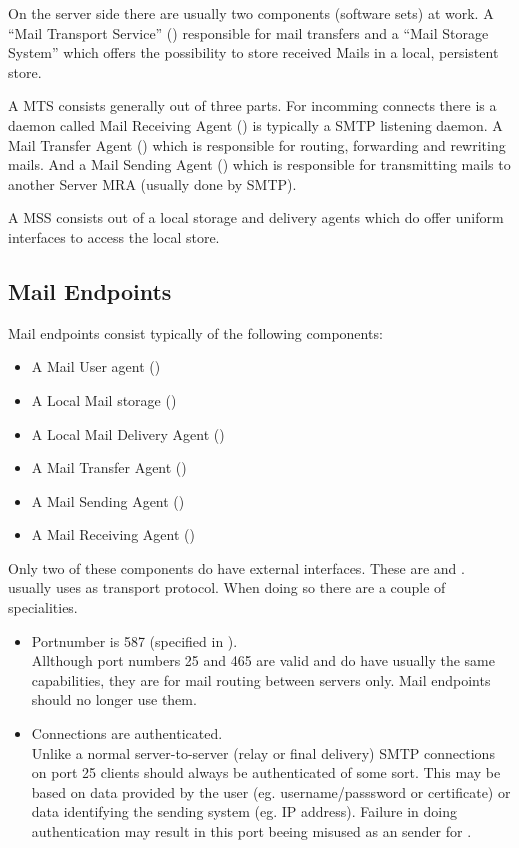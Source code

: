 On the server side there are usually two components (software sets) at work. A ``Mail Transport Service'' () responsible for mail transfers and a ``Mail Storage System'' which offers the possibility to store received Mails in a local, persistent store.\par

A MTS consists generally out of three parts. For incomming connects there is a daemon called Mail Receiving Agent () is typically a SMTP listening daemon. A Mail Transfer Agent () which is responsible for routing, forwarding and rewriting mails. And a Mail Sending Agent () which is responsible for transmitting mails to another Server MRA (usually done by SMTP).\par

A MSS consists out of a local storage and delivery agents which do offer uniform interfaces to access the local store.\par

\subsection{Mail Endpoints}
Mail endpoints consist typically of the following components:
\begin{itemize}
\item A Mail User agent ()
\item A Local Mail storage ()
\item A Local Mail Delivery Agent ()
\item A Mail Transfer Agent ()
\item A Mail Sending Agent ()
\item A Mail Receiving Agent ()
\end{itemize}

Only two of these components do have external interfaces. These are  and .  usually uses  as transport protocol. When doing so there are a couple of specialities. 
\begin{itemize}
\item Portnumber is 587 (specified in \cite{RFC4409}).\\
Allthough port numbers 25 and 465 are valid and do have usually the same capabilities, they are for mail routing between servers only. Mail endpoints should no longer use them.
\item Connections are authenticated.\\
Unlike a normal server-to-server (relay or final delivery) SMTP connections on port 25 clients should always be authenticated of some sort. This may be based on data provided by the user (eg. username/passsword or certificate) or data identifying the sending system (eg. IP address)\cite{RFC4409}. Failure in doing authentication may result in this port beeing misused as an sender for .
\end{itemize}



